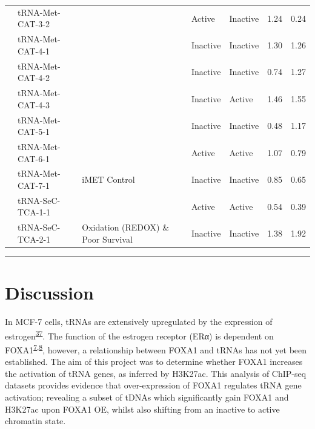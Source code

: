 \documentclass[
  12pt,
]{article}
\begin{document}
\begin{longtable}[t]{lllllrr}
\nopagebreak
 & tRNA-Met-CAT-3-2 &  & Active & Inactive & 1.24 & 0.24\\
\nopagebreak
 & tRNA-Met-CAT-4-1 &  & Inactive & Inactive & 1.30 & 1.26\\
\nopagebreak
 & tRNA-Met-CAT-4-2 &  & Inactive & Inactive & 0.74 & 1.27\\
\nopagebreak
 & tRNA-Met-CAT-4-3 &  & Inactive & Active & 1.46 & 1.55\\
\nopagebreak
 & tRNA-Met-CAT-5-1 &  & Inactive & Inactive & 0.48 & 1.17\\
\nopagebreak
 & tRNA-Met-CAT-6-1 &  & Active & Active & 1.07 & 0.79\\
\nopagebreak
\multirow[t]{-10}{*}{\raggedright\arraybackslash MET} & tRNA-Met-CAT-7-1 & \multirow[t]{-10}{*}{\raggedright\arraybackslash iMET Control} & Inactive & Inactive & 0.85 & 0.65\\
\cmidrule{1-7}\pagebreak[0]
 & tRNA-SeC-TCA-1-1 &  & Active & Active & 0.54 & 0.39\\
\nopagebreak
\multirow[t]{-2}{*}{\raggedright\arraybackslash SeC} & tRNA-SeC-TCA-2-1 & \multirow[t]{-2}{*}{\raggedright\arraybackslash Oxidation (REDOX) \& Poor Survival} & Inactive & Inactive & 1.38 & 1.92\\*
\end{longtable}
\endgroup{}

\begin{center}\rule{0.5\linewidth}{0.5pt}\end{center}

\hypertarget{discussion}{%
\section{Discussion}\label{discussion}}

In MCF-7 cells, tRNAs are extensively upregulated by the expression of estrogen\textsuperscript{\protect\hyperlink{ref-Hah2011}{37}}.
The function of the estrogen receptor (ERα) is dependent on FOXA1\textsuperscript{\protect\hyperlink{ref-carroll2005}{7},\protect\hyperlink{ref-laganiuxe8re2005}{8}}, however, a relationship between FOXA1 and tRNAs has not yet been established.
The aim of this project was to determine whether FOXA1 increases the activation of tRNA genes, as inferred by H3K27ac.
This analysis of ChIP-seq datasets provides evidence that over-expression of FOXA1 regulates tRNA gene activation; revealing a subset of tDNAs which significantly gain FOXA1 and H3K27ac upon FOXA1 OE, whilst also shifting from an inactive to active chromatin state.
\end{document}
